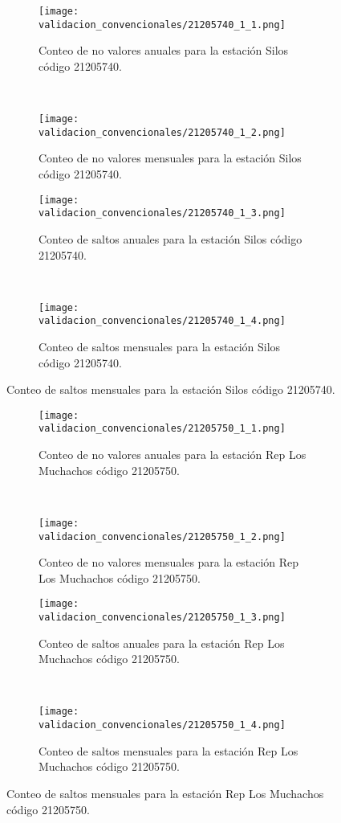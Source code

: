\begin{figure}[H]\ContinuedFloat
\centering
	\begin{subfigure}[normla]{0.4\textwidth}
	\texttt{[image: validacion\_convencionales/21205740\_1\_1.png]}
		\caption{Conteo de no valores anuales para la estación Silos código 21205740.}
		\label{subfig:a1}
		\end{subfigure}
		~
    \begin{subfigure}[normla]{0.4\textwidth}
	\texttt{[image: validacion\_convencionales/21205740\_1\_2.png]}
		\caption{Conteo de no valores mensuales para la estación Silos código 21205740.}
		\label{subfig:a2}
		\end{subfigure}
		
    \begin{subfigure}[normla]{0.4\textwidth}
	\texttt{[image: validacion\_convencionales/21205740\_1\_3.png]}
		\caption{Conteo de saltos anuales para la estación Silos código 21205740.}
		\label{subfig:a1}
		\end{subfigure}
		~
    \begin{subfigure}[normla]{0.4\textwidth}
	\texttt{[image: validacion\_convencionales/21205740\_1\_4.png]}
		\caption{Conteo de saltos mensuales para la estación Silos código 21205740.}
		\label{subfig:a2}
		\end{subfigure}

	
\end{figure}
           
\begin{figure}[H]\ContinuedFloat
\centering
	\begin{subfigure}[normla]{0.4\textwidth}
	\texttt{[image: validacion\_convencionales/21205750\_1\_1.png]}
		\caption{Conteo de no valores anuales para la estación Rep Los Muchachos código 21205750.}
		\label{subfig:a1}
		\end{subfigure}
		~
    \begin{subfigure}[normla]{0.4\textwidth}
	\texttt{[image: validacion\_convencionales/21205750\_1\_2.png]}
		\caption{Conteo de no valores mensuales para la estación Rep Los Muchachos código 21205750.}
		\label{subfig:a2}
		\end{subfigure}
		
    \begin{subfigure}[normla]{0.4\textwidth}
	\texttt{[image: validacion\_convencionales/21205750\_1\_3.png]}
		\caption{Conteo de saltos anuales para la estación Rep Los Muchachos código 21205750.}
		\label{subfig:a1}
		\end{subfigure}
		~
    \begin{subfigure}[normla]{0.4\textwidth}
	\texttt{[image: validacion\_convencionales/21205750\_1\_4.png]}
		\caption{Conteo de saltos mensuales para la estación Rep Los Muchachos código 21205750.}
		\label{subfig:a2}
		\end{subfigure}

	
\end{figure}
           

